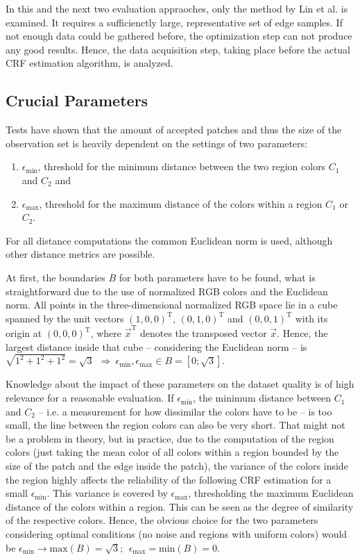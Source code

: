 In this and the next two evaluation appraoches, only the method by Lin et al. is examined. It requires a sufficienctly large, representative set of edge samples. If not enough data could be gathered before, the optimization step can not produce any good results. Hence, the data acquisition step, taking place before the actual CRF estimation algorithm, is analyzed.


\subsection{Crucial Parameters}
\label{subsec:parameterIntroduction}

Tests have shown that the amount of accepted patches and thus the size of the observation set is heavily dependent on the settings of two parameters:
\begin{enumerate}
	\item $\epsilon_\text{min}$, threshold for the minimum distance between the two region colors $C_1$ and $C_2$ and
	\item $\epsilon_\text{max}$, threshold for the maximum distance of the colors within a region $C_1$ or $C_2$.
\end{enumerate}
For all distance computations the common Euclidean norm is used, although other distance metrics are possible.

At first, the boundaries $B$ for both parameters have to be found, what is straightforward due to the use of normalized RGB colors and the Euclidean norm. All points in the three-dimensional normalized RGB space lie in a cube spanned by the unit vectors $(1, 0, 0)^\mathrm{T}$, $(0, 1, 0)^\mathrm{T}$ and $(0, 0, 1)^\mathrm{T}$ with its origin at $(0, 0, 0)^\mathrm{T}$, where $\vec{x}^\mathrm{T}$ denotes the transposed vector $\vec{x}$. Hence, the largest distance inside that cube -- considering the Euclidean norm -- is $\sqrt{1^2+1^2+1^2} = \sqrt{3} \ \ \Rightarrow \  \epsilon_\text{min}, \epsilon_\text{max} \in B = [0; \sqrt{3}]$.

Knowledge about the impact of these parameters on the dataset quality is of high relevance for a reasonable evaluation. If $\epsilon_\text{min}$, the minimum distance between $C_1$ and $C_2$ -- \hbox{i.e.} a measurement for how dissimilar the colors have to be -- is too small, the line between the region colors can also be very short. That might not be a problem in theory, but in practice, due to the computation of the region colors (just taking the mean color of all colors within a region bounded by the size of the patch and the edge inside the patch), the variance of the colors inside the region highly affects the reliability of the following CRF estimation for a small $\epsilon_\text{min}$. This variance is covered by $\epsilon_\text{max}$, thresholding the maximum Euclidean distance of the colors within a region. This can be seen as the degree of similarity of the respective colors. Hence, the obvious choice for the two parameters considering optimal conditions (no noise and regions with uniform colors) would be $\epsilon_\text{min} \rightarrow \text{max}(B) = \sqrt{3};\ \ \epsilon_\text{max} = \text{min}(B) = 0$.

